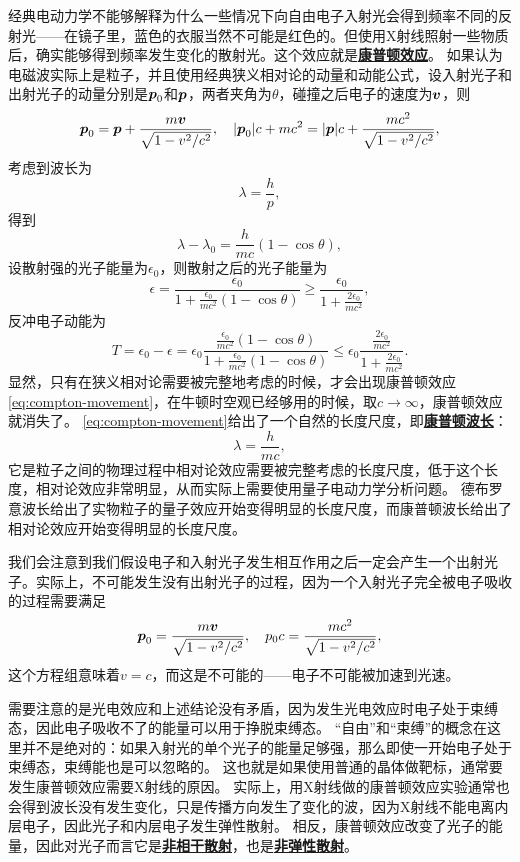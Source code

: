 \documentclass[UTF8, a4paper]{ctexart}
\newcommand*{\concept}[1]{\underline{\textbf{#1}}}
\begin{document}
经典电动力学不能够解释为什么一些情况下向自由电子入射光会得到频率不同的反射光——在镜子里，蓝色的衣服当然不可能是红色的。但使用X射线照射一些物质后，确实能够得到频率发生变化的散射光。这个效应就是\concept{康普顿效应}。
如果认为电磁波实际上是粒子，并且使用经典狭义相对论的动量和动能公式，设入射光子和出射光子的动量分别是$\vb*{p}_0$和$\vb*{p}$，两者夹角为$\theta$，碰撞之后电子的速度为$\vb*{v}$，则
\[
    \vb*{p}_0 = \vb*{p} + \frac{m \vb*{v}}{\sqrt{1 - v^2/c^2}}, \quad \abs{\vb*{p}_0} c + m c^2 = \abs{\vb*{p}} c + \frac{m c^2}{\sqrt{1 - v^2/c^2}},
\]
考虑到波长为
\[
    \lambda = \frac{h}{p},
\]
得到
\begin{equation}
    \lambda - \lambda_0 = \frac{h}{mc} (1 - \cos \theta),
    \label{eq:compton-movement}
\end{equation}
设散射强的光子能量为$\epsilon_0$，则散射之后的光子能量为
\begin{equation}
    \epsilon = \frac{\epsilon_0}{1 + \frac{\epsilon_0}{m c^2} (1 - \cos \theta)} \geq \frac{\epsilon_0}{1 + \frac{2\epsilon_0}{m c^2}},
\end{equation}
反冲电子动能为
\begin{equation}
    T = \epsilon_0 - \epsilon = \epsilon_0 \frac{\frac{\epsilon_0}{mc^2}(1-\cos \theta)}{1+\frac{\epsilon_0}{mc^2}(1-\cos \theta)} \leq \epsilon_0 \frac{\frac{2 \epsilon_0}{mc^2}}{1+\frac{2 \epsilon_0}{mc^2}}.
\end{equation}
显然，只有在狭义相对论需要被完整地考虑的时候，才会出现康普顿效应\eqref{eq:compton-movement}，在牛顿时空观已经够用的时候，取$c \to \infty$，康普顿效应就消失了。
\eqref{eq:compton-movement}给出了一个自然的长度尺度，即\concept{康普顿波长}：
\begin{equation}
    \lambda = \frac{h}{mc},
\end{equation}
它是粒子之间的物理过程中相对论效应需要被完整考虑的长度尺度，低于这个长度，相对论效应非常明显，从而实际上需要使用量子电动力学分析问题。
德布罗意波长给出了实物粒子的量子效应开始变得明显的长度尺度，而康普顿波长给出了相对论效应开始变得明显的长度尺度。

我们会注意到我们假设电子和入射光子发生相互作用之后一定会产生一个出射光子。实际上，不可能发生没有出射光子的过程，因为一个入射光子完全被电子吸收的过程需要满足
\[
    \vb*{p}_0 = \frac{m \vb*{v}}{\sqrt{1 - v^2/c^2}}, \quad p_0 c = \frac{m c^2}{\sqrt{1 - v^2 / c^2}},
\]
这个方程组意味着$v=c$，而这是不可能的——电子不可能被加速到光速。

需要注意的是光电效应和上述结论没有矛盾，因为发生光电效应时电子处于束缚态，因此电子吸收不了的能量可以用于挣脱束缚态。
“自由”和“束缚”的概念在这里并不是绝对的：如果入射光的单个光子的能量足够强，那么即使一开始电子处于束缚态，束缚能也是可以忽略的。
这也就是如果使用普通的晶体做靶标，通常要发生康普顿效应需要X射线的原因。
实际上，用X射线做的康普顿效应实验通常也会得到波长没有发生变化，只是传播方向发生了变化的波，因为X射线不能电离内层电子，因此光子和内层电子发生弹性散射。
相反，康普顿效应改变了光子的能量，因此对光子而言它是\concept{非相干散射}，也是\concept{非弹性散射}。
\end{document}
